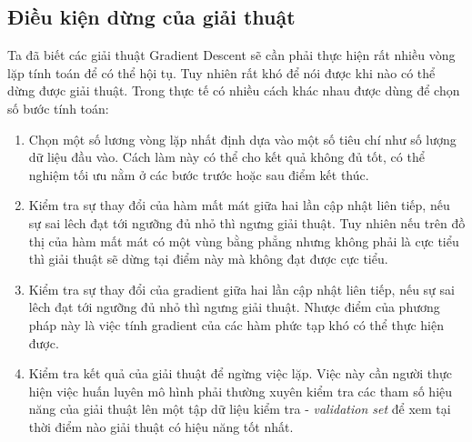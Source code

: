 \subsection{Điều kiện dừng của giải thuật}
Ta đã biết các giải thuật Gradient Descent sẽ cần phải thực hiện rất nhiều vòng lặp tính toán để có thể hội tụ. Tuy nhiên rất khó để nói được khi nào có thể dừng được giải thuật. Trong thực tế có nhiều cách khác nhau được dùng để chọn số bước tính toán:
\begin{enumerate}
	\item Chọn một số lương vòng lặp nhất định dựa vào một số tiêu chí như số lượng dữ liệu đầu vào. Cách làm này có thể cho kết quả không đủ tốt, có thể nghiệm tối ưu nằm ở các bước trước hoặc sau điểm kết thúc.
	\item Kiểm tra sự thay đổi của hàm mất mát giữa hai lần cập nhật liên tiếp, nếu sự sai lêch đạt tới ngưỡng đủ nhỏ thì ngưng giải thuật. Tuy nhiên nếu trên đồ thị của hàm mất mát có một vùng bằng phẳng nhưng không phải là cực tiểu thì giải thuật sẽ dừng tại điểm này mà không đạt được cực tiểu.
	\item Kiểm tra sự thay đổi của gradient giữa hai lần cập nhật liên tiếp, nếu sự sai lêch đạt tới ngưỡng đủ nhỏ thì ngưng giải thuật. Nhược điểm của phương pháp này là việc tính gradient của các hàm phức tạp khó có thể thực hiện được.
	\item Kiểm tra kết quả của giải thuật để ngừng việc lặp. Việc này cần người thực hiện việc huấn luyên mô hình phải thường xuyên kiểm tra các tham số hiệu năng của giải thuật lên một tập dữ liệu kiểm tra - \emph{validation set} để xem tại thời điểm nào giải thuật có hiệu năng tốt nhất.
\end{enumerate}
